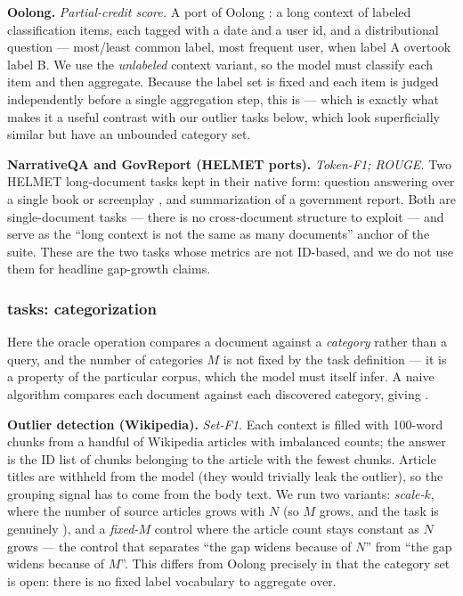 \textbf{Oolong.} \emph{Partial-credit score.} A port of Oolong \citep{Bertsch2025OolongEL}: a long context of labeled classification items, each tagged with a date and a user id, and a distributional question --- most/least common label, most frequent user, when label A overtook label B. We use the \emph{unlabeled} context variant, so the model must classify each item and then aggregate. Because the label set is fixed and each item is judged independently before a single aggregation step, this is  --- which is exactly what makes it a useful contrast with our outlier tasks below, which look superficially similar but have an unbounded category set.

\textbf{NarrativeQA and GovReport (HELMET ports).} \emph{Token-F1; ROUGE.} Two HELMET \citep{Yen2024HELMETHT} long-document tasks kept in their native form: question answering over a single book or screenplay \citep{Kocisk2017TheNR}, and summarization of a government report. Both are single-document tasks --- there is no cross-document structure to exploit --- and serve as the ``long context is not the same as many documents'' anchor of the suite. These are the two tasks whose metrics are not ID-based, and we do not use them for headline gap-growth claims.

\subsubsection{ tasks: categorization}

Here the oracle operation compares a document against a \emph{category} rather than a query, and the number of categories $M$ is not fixed by the task definition --- it is a property of the particular corpus, which the model must itself infer. A naive algorithm compares each document against each discovered category, giving .

\textbf{Outlier detection (Wikipedia).} \emph{Set-F1.} Each context is filled with 100-word chunks from a handful of Wikipedia articles with imbalanced counts; the answer is the ID list of chunks belonging to the article with the fewest chunks. Article titles are withheld from the model (they would trivially leak the outlier), so the grouping signal has to come from the body text. We run two variants: \emph{scale-$k$}, where the number of source articles grows with $N$ (so $M$ grows, and the task is genuinely ), and a \emph{fixed-$M$} control where the article count stays constant as $N$ grows --- the control that separates ``the gap widens because of $N$'' from ``the gap widens because of $M$''. This differs from Oolong precisely in that the category set is open: there is no fixed label vocabulary to aggregate over.

